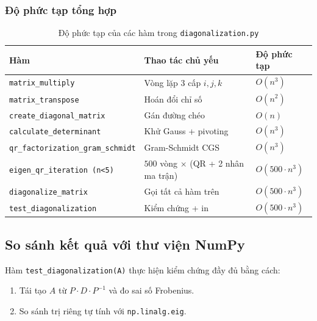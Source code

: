 \documentclass[a4paper,12pt]{report}
\begin{document}
\subsubsection{Độ phức tạp tổng hợp}

\begin{table}[H]
  \centering
  \hspace*{-2.5em}
  \begin{tabular}{|p{8cm}|p{5cm}|p{3cm}|}
  \hline
  \textbf{Hàm} & \textbf{Thao tác chủ yếu} & \textbf{Độ phức tạp} \\
  \hline

  \texttt{matrix\_multiply} & Vòng lặp 3 cấp $i,j,k$ & $O(n^3)$ \\
  \hline

  \texttt{matrix\_transpose} & Hoán đổi chỉ số & $O(n^2)$ \\
  \hline

  \texttt{create\_diagonal\_matrix} & Gán đường chéo & $O(n)$ \\
  \hline

  \texttt{calculate\_determinant} & Khử Gauss + pivoting & $O(n^3)$ \\
  \hline

  \texttt{qr\_factorization\_gram\_schmidt} & Gram-Schmidt CGS & $O(n^3)$ \\
  \hline

  \texttt{eigen\_qr\_iteration (n<5)} & $500$ vòng $\times$ (QR + 2 nhân ma trận) & $O(500 \cdot n^3)$ \\
  \hline

  \texttt{diagonalize\_matrix} & Gọi tất cả hàm trên & $O(500 \cdot n^3)$ \\
  \hline

  \texttt{test\_diagonalization} & Kiểm chứng + in & $O(500 \cdot n^3)$ \\
  \hline

  \end{tabular}

  \caption{Độ phức tạp của các hàm trong \texttt{diagonalization.py}}
\end{table}

\subsection{So sánh kết quả với thư viện NumPy}
Hàm \texttt{test\_diagonalization(A)} thực hiện kiểm chứng đầy đủ bằng cách:

\begin{enumerate}
  \item Tái tạo $A$ từ $P \cdot D \cdot P^{-1}$ và đo sai số Frobenius.
  \item So sánh trị riêng tự tính với \texttt{np.linalg.eig}.
\end{enumerate}
\end{document}
